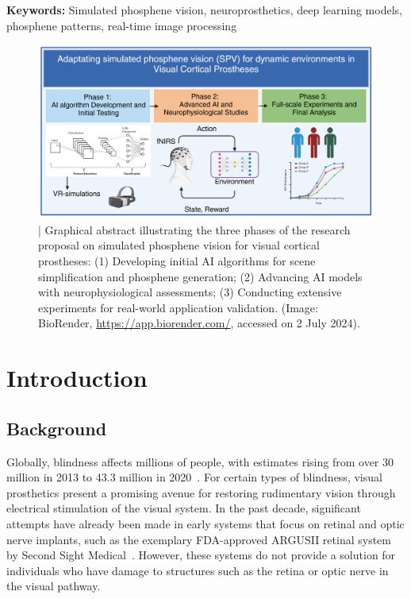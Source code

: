 \documentclass[10pt]{article}
\begin{document}
\textbf{Keywords:} Simulated  phosphene vision, neuroprosthetics, deep learning models, phosphene patterns, real-time image processing

\pagestyle{rest} %
\clearpage %

\begin{figure}[ht!]
  \centering
  \includegraphics[width=1.0\textwidth]{imgs/SPV_VCP_pipeline.png}
  \caption{| Graphical abstract illustrating the three phases of the research proposal on simulated phosphene vision for visual cortical prostheses: (1) Developing initial AI algorithms for scene simplification and phosphene generation; (2) Advancing AI models with neurophysiological assessments; (3) Conducting extensive experiments for real-world application validation. (Image: BioRender, \href{https://app.biorender.com/}{https://app.biorender.com/}, accessed on 2 July 2024).}\label{fig:graphical_abstract}
\end{figure}

\section*{Introduction}\label{sec:intro}
\subsection*{Background}\label{subsec:background}
Globally, blindness affects millions of people, with estimates rising from over
30 million in 2013 to 43.3 million in
2020~\parencite{stevensGlobalPrevalenceVision2013,bourneTrendsPrevalenceBlindness2021}.
For certain types of blindness, visual prosthetics present a promising avenue
for restoring rudimentary vision through electrical stimulation of the visual
system. In the past decade, significant attempts have already been made in early
systems that focus on retinal and optic nerve implants, such as the exemplary
FDA-approved ARGUSII retinal system by Second Sight
Medical~\parencite{hoLongTermResultsEpiretinal2015}. However, these systems do
not provide a solution for individuals who have damage to structures such as the
retina or optic nerve in the visual pathway.
\end{document}
